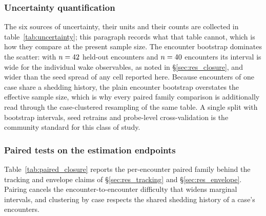 \subsubsection*{Uncertainty quantification}
The six sources of uncertainty, their
units and their counts are collected in table~\ref{tab:uncertainty}; this
paragraph records what that table cannot, which is how they compare at the
present sample size. The encounter bootstrap dominates the scatter: with
$n = 42$ held-out \TestSplit{} encounters and $n = 40$
\BoundarySplit{} encounters its interval is wide for the individual wake
observables, as noted in \S\ref{sec:res_closure}, and wider than the seed
spread of any cell reported here. Because encounters of one case share a
shedding history, the plain encounter bootstrap overstates the effective
sample size, which is why every paired family comparison is additionally read
through the case-clustered resampling of the same table. A single split with
bootstrap intervals, seed retrains and probe-level cross-validation is the
community standard for this class of study.\re


\subsubsection*{Paired tests on the estimation endpoints}
Table~\ref{tab:paired_closure} reports the per-encounter paired
family behind the tracking and envelope claims of \S\ref{sec:res_tracking} and
\S\ref{sec:res_envelope}. Pairing cancels the encounter-to-encounter difficulty
that widens marginal intervals, and clustering by case respects the shared
shedding history of a case's encounters.\re

